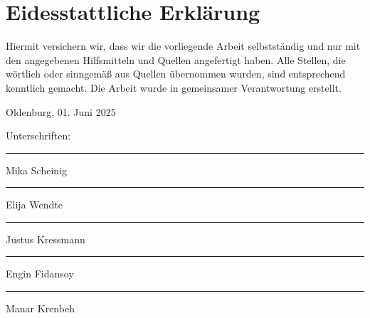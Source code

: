 \documentclass[12pt,a4paper]{article}
\begin{document}
	\newpage
	\section*{Eidesstattliche Erklärung}
	Hiermit versichern wir, dass wir die vorliegende Arbeit selbstständig und nur mit den angegebenen Hilfsmitteln und Quellen angefertigt haben. Alle Stellen, die wörtlich oder sinngemäß aus Quellen übernommen wurden, sind entsprechend kenntlich gemacht. Die Arbeit wurde in gemeinsamer Verantwortung erstellt.
	
	\vspace{2cm}
	Oldenburg, 01. Juni 2025
	
	Unterschriften: \\
	\rule{5cm}{0.4pt} Mika Scheinig \\
	\rule{5cm}{0.4pt} Elija Wendte \\
	\rule{5cm}{0.4pt} Justus Kressmann \\
	\rule{5cm}{0.4pt} Engin Fidansoy \\
	\rule{5cm}{0.4pt} Manar Krenbeh
	
	
	
\end{document}
